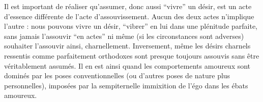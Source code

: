 Il est important de réaliser qu’assumer, donc aussi ``vivre'' un désir, est un acte d’essence différente de l’acte d’assouvissement. Aucun des deux actes n’implique l’autre : nous pouvons vivre un désir, ``vibrer'' en lui dans une plénitude parfaite, sans jamais l’assouvir ``en actes'' ni même (si les circonstances sont adverses) souhaiter l’assouvir ainsi, charnellement. Inversement, même les désirs charnels ressentis comme parfaitement orthodoxes sont presque toujours assouvis sans être véritablement assumés. Il en est ainsi quand les comportements amoureux sont dominés par les poses conventionnelles (ou d’autres poses de nature plus personnelles), imposées par la sempiternelle immixition de l’égo dans les ébats amoureux.

